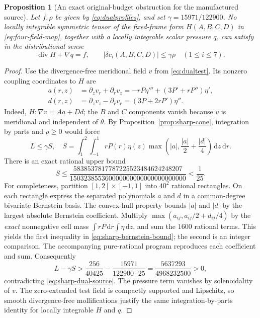\documentclass[11pt,a4paper]{article}
\theoremstyle{plain}
\newtheorem{proposition}[theorem]{Proposition}
\theoremstyle{definition}
\newcommand{\diver}{\operatorname{div}}
\newcommand{\dd}{\,\mathrm{d}}
\begin{document}
\begin{proposition}[An exact original-budget obstruction for the
manufactured source]\label{prop:original-obstruction}
Let $f,\rho$ be given by \eqref{eq:dualprofiles}, and set
$\gamma=15971/122900$. No locally integrable symmetric tensor of
the fixed-frame form $H(A,B,C,D)$ in \eqref{eq:four-field-map},
together with a locally integrable scalar pressure $q$, can satisfy
in the distributional sense
\[
  \diver H+\nabla q=f,\qquad
  |\delta c_i(A,B,C,D)|\le\gamma\rho\quad(1\le i\le7).
\]
\end{proposition}

\begin{proof}
Use the divergence-free meridional field $v$ from
\eqref{eq:dualtest}. Its nonzero coupling coordinates to $H$ are
\begin{align*}
 a(r,z)&=\partial_zv_r+\partial_rv_z
      =-rP\eta'''+(3P'+rP'')\eta',\\
 d(r,z)&=\partial_zv_z-\partial_rv_r
      =(3P+2rP')\eta''.
\end{align*}
Indeed, $H:\nabla v=Aa+Dd$; the $B$ and $C$ components vanish
because $v$ is meridional and independent of $\theta$.
By Proposition~\ref{prop:sharp-cone}, integration by parts and
$\rho\ge0$ would force
\begin{equation}\label{eq:sharp-dual-source}
 L\le\gamma S,\quad
 S=\int_1^2\!\int_{-1}^1
 rP(r)\eta(z)
 \max\!\left(|a|,\frac{|a|}{2}+\frac{|d|}{4}\right)
 \dd z\dd r.
\end{equation}
There is an exact rational upper bound
\begin{equation}\label{eq:sharp-bernstein-bound}
 S\le
 \frac{5838537817787225523484624248207}
 {150323855360000000000000000000000}
 <\frac1{25}.
\end{equation}
For completeness, partition $[1,2]\times[-1,1]$ into $40^2$
rational rectangles. On each rectangle express the separated
polynomials $a$ and $d$ in a common-degree bivariate Bernstein
basis. The convex-hull property bounds $|a|$ and $|d|$ by the
largest absolute Bernstein coefficient. Multiply
$\max(a_{ij},a_{ij}/2+d_{ij}/4)$ by the \emph{exact} nonnegative
cell mass $\int rP\dd r\int\eta\dd z$, and sum the $1600$
rational terms. This yields the first inequality in
\eqref{eq:sharp-bernstein-bound}; the second is an integer
comparison. The accompanying pure-rational program reproduces
each coefficient and sum. Consequently
\[
 L-\gamma S
 >\frac{256}{40425}-\frac{15971}{122900\cdot25}
 =\frac{5637293}{4968232500}>0,
\]
contradicting \eqref{eq:sharp-dual-source}. The pressure term
vanishes by solenoidality of $v$. The zero-extended test field is
compactly supported and Lipschitz, so smooth divergence-free
mollifications justify the same integration-by-parts identity for
locally integrable $H$ and $q$.
\end{proof}
\end{document}
